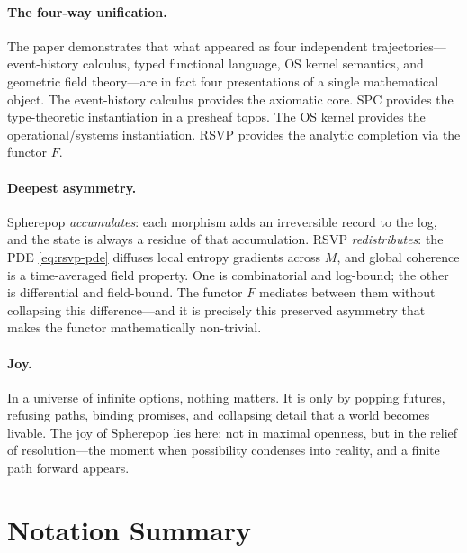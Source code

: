 \documentclass[12pt, a4paper]{article}
\theoremstyle{definition}
\theoremstyle{remark}
\begin{document}
\paragraph{The four-way unification.}
The paper demonstrates that what appeared as four independent trajectories—event-history
calculus, typed functional language, OS kernel semantics, and geometric field theory—are
in fact four presentations of a single mathematical object. The event-history calculus
provides the axiomatic core. SPC provides the type-theoretic instantiation in a presheaf
topos. The OS kernel provides the operational/systems instantiation. RSVP provides the
analytic completion via the functor $F$.

\paragraph{Deepest asymmetry.}
Spherepop \emph{accumulates}: each morphism adds an irreversible record to the log, and
the state is always a residue of that accumulation. RSVP \emph{redistributes}: the PDE
\eqref{eq:rsvp-pde} diffuses local entropy gradients across $M$, and global coherence
is a time-averaged field property. One is combinatorial and log-bound; the other is
differential and field-bound. The functor $F$ mediates between them without collapsing
this difference—and it is precisely this preserved asymmetry that makes the functor
mathematically non-trivial.

\paragraph{Joy.}
In a universe of infinite options, nothing matters. It is only by popping futures,
refusing paths, binding promises, and collapsing detail that a world becomes livable.
The joy of Spherepop lies here: not in maximal openness, but in the relief of
resolution—the moment when possibility condenses into reality, and a finite path
forward appears.

\appendix
\section{Notation Summary}
\end{document}
